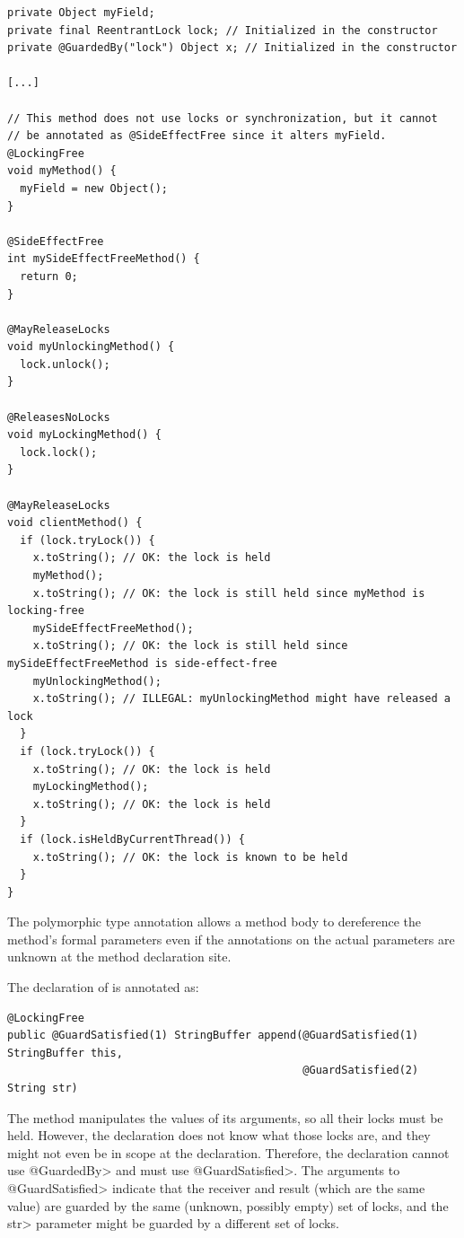 \begin{verbatim}
private Object myField;
private final ReentrantLock lock; // Initialized in the constructor
private @GuardedBy("lock") Object x; // Initialized in the constructor

[...]

// This method does not use locks or synchronization, but it cannot
// be annotated as @SideEffectFree since it alters myField.
@LockingFree
void myMethod() {
  myField = new Object();
}

@SideEffectFree
int mySideEffectFreeMethod() {
  return 0;
}

@MayReleaseLocks
void myUnlockingMethod() {
  lock.unlock();
}

@ReleasesNoLocks
void myLockingMethod() {
  lock.lock();
}

@MayReleaseLocks
void clientMethod() {
  if (lock.tryLock()) {
    x.toString(); // OK: the lock is held
    myMethod();
    x.toString(); // OK: the lock is still held since myMethod is locking-free
    mySideEffectFreeMethod();
    x.toString(); // OK: the lock is still held since mySideEffectFreeMethod is side-effect-free
    myUnlockingMethod();
    x.toString(); // ILLEGAL: myUnlockingMethod might have released a lock
  }
  if (lock.tryLock()) {
    x.toString(); // OK: the lock is held
    myLockingMethod();
    x.toString(); // OK: the lock is held
  }
  if (lock.isHeldByCurrentThread()) {
    x.toString(); // OK: the lock is known to be held
  }
}
\end{verbatim}



The polymorphic  type annotation allows a method body
to dereference the method's formal parameters even if the
 annotations on the actual parameters are unknown at
the method declaration site.

The declaration of
is annotated as:

\begin{verbatim}
@LockingFree
public @GuardSatisfied(1) StringBuffer append(@GuardSatisfied(1) StringBuffer this,
                                              @GuardSatisfied(2) String str)
\end{verbatim}

The method manipulates the values of its arguments, so all their locks must
be held.  However, the declaration does not know what those locks are, and they
might not even be in scope at the declaration.  Therefore, the declaration
cannot use \<@GuardedBy> and must use \<@GuardSatisfied>.  The arguments to
\<@GuardSatisfied> indicate that the receiver and result (which are the
same value) are guarded by the same (unknown, possibly empty) set of locks,
and the \<str> parameter might be guarded by a different set of locks.

